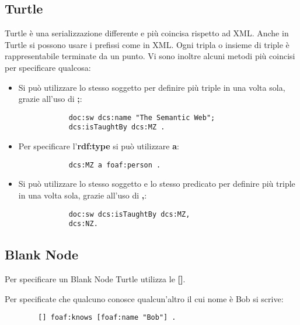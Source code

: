 \subsection{Turtle}
Turtle è una serializzazione differente e più coincisa rispetto ad XML. Anche in Turtle si possono usare i prefissi come in XML. Ogni tripla o insieme di triple è rappresentabile terminate da un punto. Vi sono inoltre alcuni metodi più coincisi per specificare qualcosa:
\begin{itemize}
	\item Si può utilizzare lo stesso soggetto per definire più triple in una volta sola, grazie all'uso di \textbf{;}:
	\begin{info}[Esempio]
		\begin{verbatim}
			doc:sw dcs:name "The Semantic Web";
			dcs:isTaughtBy dcs:MZ .
		\end{verbatim}
	\end{info}
	\item Per specificare l'\textbf{rdf:type} si può utilizzare \textbf{a}:
	\begin{info}[Esempio]
		\begin{verbatim}
			dcs:MZ a foaf:person .
		\end{verbatim}
	\end{info}
	\item Si può utilizzare lo stesso soggetto e lo stesso predicato per definire più triple in una volta sola, grazie all'uso di \textbf{,}:
	\begin{info}[Esempio]
		\begin{verbatim}
			doc:sw dcs:isTaughtBy dcs:MZ,
			dcs:NZ.
		\end{verbatim}
	\end{info}
\end{itemize}

\subsection{Blank Node}
Per specificare un Blank Node Turtle utilizza le \textbf{[]}.
\begin{info}[Esempio]
	Per specificate che qualcuno conosce qualcun'altro il cui nome è Bob si scrive:
	\begin{verbatim}
		[] foaf:knows [foaf:name "Bob"] .
	\end{verbatim}
\end{info}
\newpage
